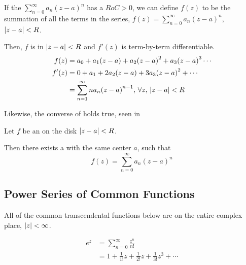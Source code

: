\begin{theorem}\label{thm:Power_Series-Analytic_Function}
  If the  $\sum_{n=0}^{\infty} a_{n} {(z-a)}^{n}$ has a  $RoC > 0$, we can define $f(z)$ to be the summation of all the terms in the series, $f(z) = \sum_{n = 0}^{\infty} a_{n} {(z-a)}^{n}$, $\left\lvert z-a \right\rvert < R$.

  Then, $f$ is  in $\left\lvert z-a \right\rvert < R$ and $f'(z)$ is term-by-term differentiable.
  \begin{align*}
    f(z) &= a_{0} + a_{1} (z-a) + a_{2} {(z-a)}^{2} + a_{3} {(z-a)}^{3} \cdots \\
    f'(z) &= 0 + a_{1} + 2 a_{2} (z-a) + 3 a_{3} {(z-a)}^{2} + \cdots \\
         &= \sum_{n=1}^{\infty} n a_{n} {(z-a)}^{n-1}, \, \forall z, \, \left\lvert z-a \right\rvert < R
  \end{align*}
\end{theorem}

Likewise, the converse of  holds true, seen in 

\begin{theorem}\label{thm:Analytic_Function-Power_Series}
  Let $f$ be an   on the disk $\left\lvert z-a \right\rvert < R$.

  Then there exists a  with the same center $a$, such that
  \begin{equation*}
    f(z) = \sum_{n = 0}^{\infty} a_{n} {(z-a)}^{n}
  \end{equation*}
\end{theorem}

\subsection{Power Series of Common Functions}\label{subsec:Common_Function_Power_Series}
All of the common transcendental functions below are  on the entire complex place, $\left\lvert z \right\rvert < \infty$.

\begin{equation}\label{eq:Complex_Power_Series-e}
  \begin{aligned}
    e^{z} &= \sum_{n=0}^{\infty} \frac{z^{n}}{n!} \\
    & = 1 + \frac{1}{1!} z + \frac{1}{2!} z + \frac{1}{3!} z^{3} + \cdots
  \end{aligned}
\end{equation}

